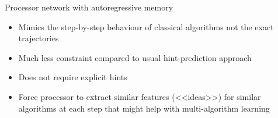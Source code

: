 \documentclass[10pt]{beamer}
\begin{document}
\begin{frame}{Processor network with autoregressive memory}
	\begin{itemize}
		\item Mimics the step-by-step behaviour of classical algorithms not the exact trajectories
		\item Much less constraint compared to usual hint-prediction approach
		\item Does not require explicit hints
		\item Force processor to extract similar features (<<ideas>>) for similar algorithms at each step that might help with multi-algorithm learning
	\end{itemize}
\end{frame}
\end{document}
